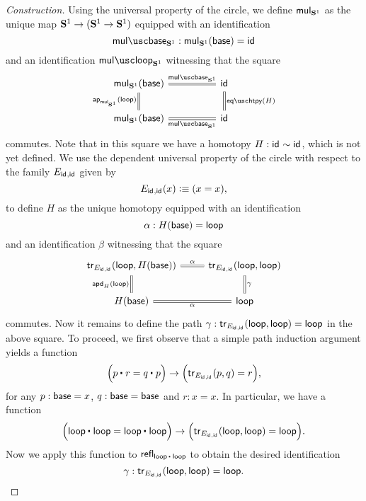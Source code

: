 \begin{proof}[Construction]
  Using the universal property of the circle, we define $\mathsf{mul}_{\mathbf{S}^{1}}$ as the unique map $\mathbf{S}^{1}\to(\mathbf{S}^{1}\to\mathbf{S}^{1})$ equipped with an identification
  \begin{equation*}
    \mulcirclebase :\mulcircle(\base)=\idfunc
  \end{equation*}
  and an identification $\mulcircleloop$ witnessing that the square
  \begin{equation*}
    \begin{tikzcd}[column sep=huge]
      \mulcircle(\base) \arrow[r,equals,"\mulcirclebase"] \arrow[d,equals,swap,"\ap{\mulcircle}{\lloop}"] & \idfunc \arrow[d,equals,"\eqhtpy(H)"] \\
      \mulcircle(\base) \arrow[r,equals,swap,"\mulcirclebase"] & \idfunc
  \end{tikzcd}
  \end{equation*}
  commutes. Note that in this square we have a homotopy $H:\mathsf{id}_{}\sim\mathsf{id}_{}$, which is not yet defined. We  use the dependent universal property of the circle with respect to the family $E_{\mathsf{id}_{},\mathsf{id}_{}}$ given by
  \begin{equation*}
    E_{\mathsf{id}_{},\mathsf{id}_{}}(x) \vcentcolon\equiv (x=x),
  \end{equation*}
  to define $H$ as the unique homotopy equipped with an identification
  \begin{equation*}
    \alpha : H(\mathsf{base})=\mathsf{loop}
  \end{equation*}
  and an identification $\beta$ witnessing that the square
  \begin{equation*}
    \begin{tikzcd}
      \tr_{E_{\idfunc,\idfunc}}(\lloop,H(\base)) \arrow[r,equals,"\alpha"] \arrow[d,equals,swap,"\apd{H}{\lloop}"] & \tr_{E_{\idfunc,\idfunc}}(\lloop,\lloop) \arrow[d,equals,"\gamma"] \\
      H(\base) \arrow[r,equals,swap,"\alpha"] & \lloop
    \end{tikzcd}
  \end{equation*}
  commutes. Now it remains to define the path $\gamma:\mathsf{tr}_{E_{\mathsf{id}_{},\mathsf{id}_{}}}(\mathsf{loop},\mathsf{loop})=\mathsf{loop}$ in the above square. To proceed, we first observe that a simple path induction argument yields a function
  \begin{equation*}
    \Big(\ct{p}{r}=\ct{q}{p}\Big)\to\Big(\tr_{E_{\idfunc,\idfunc}}(p,q)=r\Big),
  \end{equation*}
  for any $p:\mathsf{base}=x$, $q:\mathsf{base}=\mathsf{base}$ and $r:x=x$. In particular, we have a function
  \begin{equation*}
    \Big(\ct{\lloop}{\lloop}=\ct{\lloop}{\lloop}\Big)\to\Big(\tr_{E_{\idfunc,\idfunc}}(\lloop,\lloop)=\lloop\Big).
  \end{equation*}
  Now we apply this function to $\refl{\ct{\lloop}{\lloop}}$ to obtain the desired identification
  \begin{equation*}
    \gamma:\mathsf{tr}_{E_{\mathsf{id}_{},\mathsf{id}_{}}}(\mathsf{loop},\mathsf{loop})=\mathsf{loop}.\qedhere
  \end{equation*}
\end{proof}


